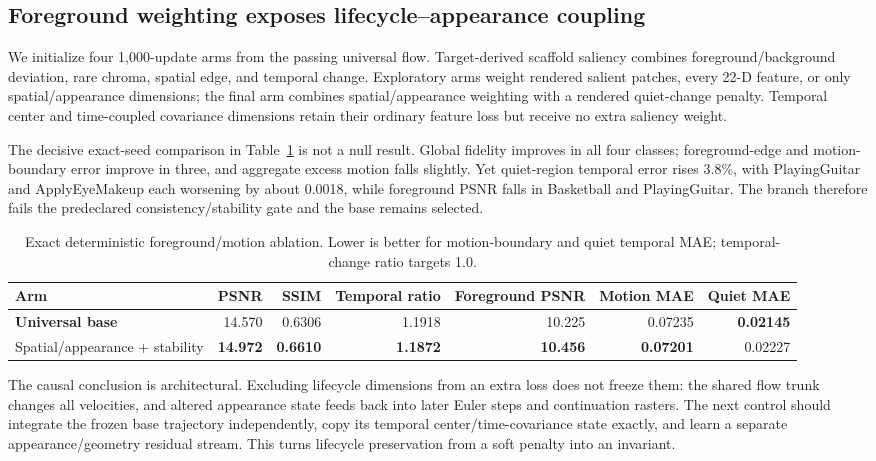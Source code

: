 \documentclass[10pt]{article}
\begin{document}
\subsection{Foreground weighting exposes lifecycle--appearance coupling}

We initialize four 1,000-update arms from the passing universal flow. Target-derived scaffold
saliency combines foreground/background deviation, rare chroma, spatial edge, and temporal change.
Exploratory arms weight rendered salient patches, every 22-D feature, or only spatial/appearance
dimensions; the final arm combines spatial/appearance weighting with a rendered quiet-change
penalty. Temporal center and time-coupled covariance dimensions retain their ordinary feature loss
but receive no extra saliency weight.

The decisive exact-seed comparison in Table~\ref{tab:foregroundablation} is not a null result.
Global fidelity improves in all four classes; foreground-edge and motion-boundary error improve in
three, and aggregate excess motion falls slightly. Yet quiet-region temporal error rises 3.8\%,
with PlayingGuitar and ApplyEyeMakeup each worsening by about 0.0018, while foreground PSNR falls in
Basketball and PlayingGuitar. The branch therefore fails the predeclared consistency/stability gate
and the base remains selected.

\begin{table}[H]
\centering
\small
\caption{Exact deterministic foreground/motion ablation. Lower is better for motion-boundary and
quiet temporal MAE; temporal-change ratio targets 1.0.}
\label{tab:foregroundablation}
\begin{tabular}{@{}lrrrrrr@{}}
\toprule
Arm & PSNR & SSIM & Temporal ratio & Foreground PSNR & Motion MAE & Quiet MAE \\
\midrule
\textbf{Universal base} & 14.570 & 0.6306 & 1.1918 & 10.225 & 0.07235 & \textbf{0.02145} \\
Spatial/appearance + stability & \textbf{14.972} & \textbf{0.6610} & \textbf{1.1872} & \textbf{10.456} & \textbf{0.07201} & 0.02227 \\
\bottomrule
\end{tabular}
\end{table}

The causal conclusion is architectural. Excluding lifecycle dimensions from an extra loss does not
freeze them: the shared flow trunk changes all velocities, and altered appearance state feeds back
into later Euler steps and continuation rasters. The next control should integrate the frozen base
trajectory independently, copy its temporal center/time-covariance state exactly, and learn a
separate appearance/geometry residual stream. This turns lifecycle preservation from a soft
penalty into an invariant.
\end{document}
